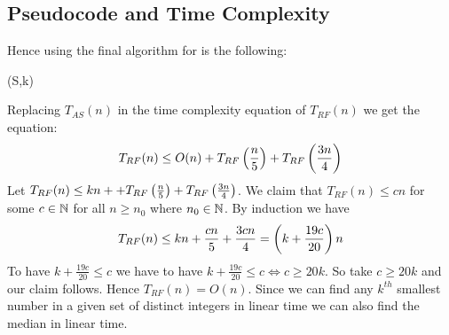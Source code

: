 \subsection{Pseudocode and Time Complexity}
Hence using  the final algorithm for  is the following:
\begin{center}
	\begin{algorithm}
		\DontPrintSemicolon
		\caption{(S,k)}
	\end{algorithm}
\end{center}
Replacing $T_{AS}(n)$ in the time complexity equation of $T_{RF}(n)$ we get the equation:$$T_{RF}(n)\leq O(n)+T_{RF}\left(\frac{n}5\right)+T_{RF}\left(\frac{3n}{4}\right)$$Let $T_{RF}(n)\leq kn++T_{RF}\left(\frac{n}5\right)+T_{RF}\left(\frac{3n}{4}\right)$. We claim that $T_{RF}(n)\leq cn$ for some $c\in \mathbb{N}$ for all $n\geq n_0$ where $n_0\in \mathbb{N}$. By induction we have $$T_{RF}(n)\leq kn+\frac{cn}{5}+\frac{3cn}{4}=\left(k+\frac{19c}{20}\right)n$$To have  $k+\frac{19c}{20}\leq c$ we have to have $k+\frac{19c}{20}\leq c\iff c\geq 20k$. So take $c\geq 20k$ and our claim follows. Hence $T_{RF}(n)=O(n)$. Since we can find any $k^{th}$ smallest number in a given set of distinct integers in linear time we can also find the median in linear time.